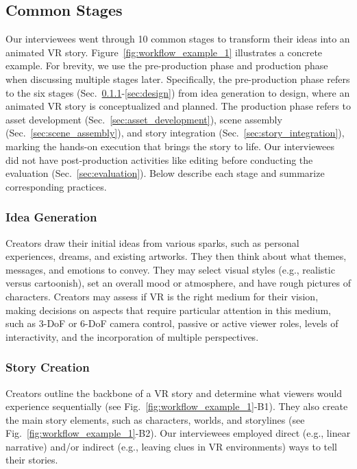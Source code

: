 \subsection{Common Stages}
\label{sec:common_stages}

Our interviewees went through 10 common stages to transform their ideas into an animated VR story. 
Figure~\ref{fig:workflow_example_1} illustrates a concrete example. 
For brevity, we use the pre-production phase and production phase when discussing multiple stages later. Specifically, the pre-production phase refers to the six stages (Sec.~\ref{sec:idea_generation}-\ref{sec:design}) from idea generation to design, where an animated VR story is conceptualized and planned. The production phase refers to asset development (Sec.~\ref{sec:asset_development}), scene assembly (Sec.~\ref{sec:scene_assembly}), and story integration (Sec.~\ref{sec:story_integration}), marking the hands-on execution that brings the story to life. Our interviewees did not have post-production activities like editing before conducting the evaluation (Sec.~\ref{sec:evaluation}).
Below describe each stage and summarize corresponding practices.


\subsubsection{Idea Generation}
\label{sec:idea_generation}
Creators draw their initial ideas from various sparks, such as personal experiences, dreams, and existing artworks. They then think about what themes, messages, and emotions to convey. 
They may select visual styles (e.g., realistic versus cartoonish), set an overall mood or atmosphere, and have rough pictures of characters. 
Creators may assess if VR is the right medium for their vision, making decisions on aspects that require particular attention in this medium, such as 3-DoF or 6-DoF camera control, passive or active viewer roles, levels of interactivity, and the incorporation of multiple perspectives. 

\subsubsection{Story Creation}
\label{sec:story_creation}
Creators outline the backbone of a VR story and determine what viewers would experience sequentially (see Fig.~\ref{fig:workflow_example_1}-B1). They also create the main story elements, such as characters, worlds, and storylines (see Fig.~\ref{fig:workflow_example_1}-B2). Our interviewees employed direct (e.g., linear narrative) and/or indirect (e.g., leaving clues in VR environments) ways to tell their stories.

